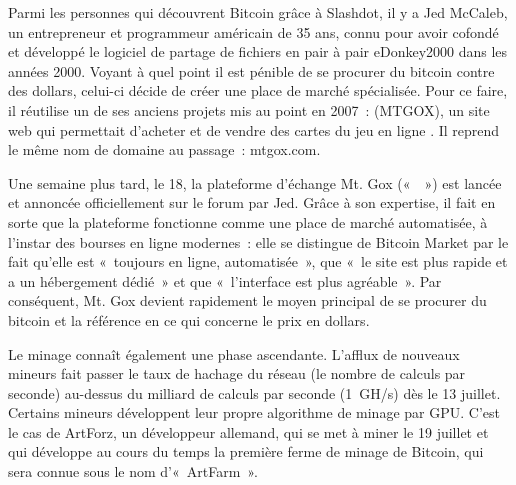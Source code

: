Parmi les personnes qui découvrent Bitcoin grâce à Slashdot, il y a Jed McCaleb, un entrepreneur et programmeur américain de 35 ans, connu pour avoir cofondé et développé le logiciel de partage de fichiers en pair à pair eDonkey2000 dans les années 2000. Voyant à quel point il est pénible de se procurer du bitcoin contre des dollars, celui-ci décide de créer une place de marché spécialisée. Pour ce faire, il réutilise un de ses anciens projets mis au point en 2007~:  (MTGOX), un site web qui permettait d'acheter et de vendre des cartes du jeu en ligne . Il reprend le même nom de domaine au passage~: mtgox.com.

Une semaine plus tard, le 18, la plateforme d'échange Mt. Gox («~~») est lancée et annoncée officiellement sur le forum par Jed. Grâce à son expertise, il fait en sorte que la plateforme fonctionne comme une place de marché automatisée, à l'instar des bourses en ligne modernes~: elle se distingue de Bitcoin Market par le fait qu'elle est «~toujours en ligne, automatisée~», que «~le site est plus rapide et a un hébergement dédié~» et que «~l'interface est plus agréable~». Par conséquent, Mt. Gox devient rapidement le moyen principal de se procurer du bitcoin et la référence en ce qui concerne le prix en dollars.

Le minage connaît également une phase ascendante. L'afflux de nouveaux mineurs fait passer le taux de hachage du réseau (le nombre de calculs par seconde) au-dessus du milliard de calculs par seconde (1~GH/s) dès le 13 juillet. Certains mineurs développent leur propre algorithme de minage par GPU. C'est le cas de ArtForz, un développeur allemand, qui se met à miner le 19 juillet et qui développe au cours du temps la première ferme de minage de Bitcoin, qui sera connue sous le nom d'«~ArtFarm~».

